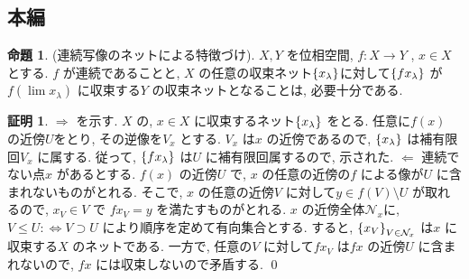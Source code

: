 \documentclass[10pt, fleqn, label-section=none]{bxjsarticle}
\theoremstyle{definition}
\newtheorem{prop}[dfn]{命題}
\newtheorem*{pf*}{証明}
\newcommand{\cbra}[1]{\mleft\{#1\mright\}}
\newcommand{\LR}{\Leftrightarrow}
\newcommand{\naraba}{\Rightarrow}
\newcommand{\gyaku}{\Leftarrow}
\renewcommand{\;}{\, ; \,}
\begin{document}
\subsection{本編}

\begin{prop}(連続写像のネットによる特徴づけ). $X, Y$ を位相空間, $f : X \rightarrow Y$ , $x \in X$とする. $f$ が連続であることと, $X$ の任意の収束ネット$\cbra{x_\lambda}$に対して$\cbra{fx_\lambda}$ が$f (\lim x_\lambda )$ に収束する$Y$ の収束ネットとなることは, 必要十分である. 
\end{prop}
\begin{pf*}
$\naraba$ を示す. $X$ の, $x \in X$ に収束するネット$\cbra{x_\lambda}$ をとる. 任意に$f(x)$ の近傍$U$をとり, その逆像を$V_x$ とする. $V_x$ は$x$ の近傍であるので, $\cbra{x_\lambda}$ は補有限回$V_x$ に属する. 従って, $\cbra{fx_\lambda}$ は$U$ に補有限回属するので, 示された. $\gyaku$ 連続でない点$x$ があるとする. $f(x)$ の近傍$U$ で, $x$ の任意の近傍の$f$ による像が$U$ に含まれないものがとれる. そこで, $x$ の任意の近傍$V$ に対して$y \in f(V) \setminus U$ が取れるので, $x_V \in V$ で $fx_V = y$ を満たすものがとれる. $x$ の近傍全体$\mathcal N _x$に, $V \leq  U :\LR V \supset U$ により順序を定めて有向集合とする. すると, $\cbra{x_V}_{V \in \mathcal N _x}$ は$x$ に収束する$X$ のネットである. 一方で, 任意の$V$ に対して$fx_V$ は$fx$ の近傍$U$ に含まれないので, $fx$ には収束しないので矛盾する. 
\qed
\end{pf*}
\end{document}
